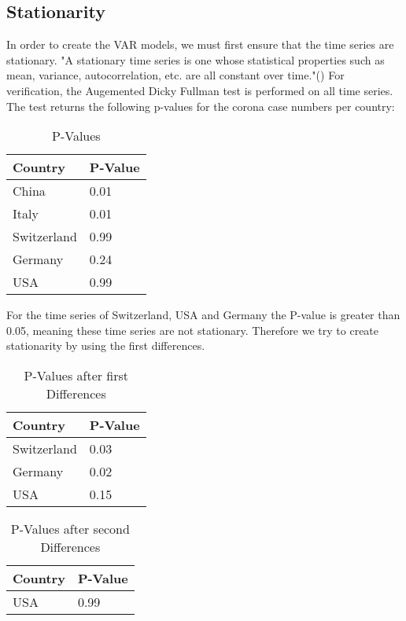 \documentclass[11pt]{article}
\begin{document}
\subsection{Stationarity}
In order to create the VAR models, we must first ensure that the time series are stationary. "A stationary time series is one whose statistical properties such as mean, variance, autocorrelation, etc. are all constant over time."(\cite{Stationa72:online}) For verification, the Augemented Dicky Fullman test is performed on all time series. The test returns the following p-values for the corona case numbers per country:
\begin{table}[h!]
\centering
\caption{P-Values }
\label{tab:p-values-corona}
\begin{tabular}{|l|l|}
\hline
\textbf{Country} & \textbf{P-Value} \\ \hline
China            & 0.01             \\ \hline
Italy            & 0.01             \\ \hline
Switzerland      & 0.99             \\ \hline
Germany          & 0.24             \\ \hline
USA              & 0.99             \\ \hline
\end{tabular}
\end{table}
For the time series of Switzerland, USA and Germany the P-value is greater than 0.05, meaning these time series are not stationary. Therefore we try to create stationarity by using the first differences.
\begin{table}[h!]
\centering
\caption{P-Values after first Differences}
\label{tab:p-values-first-diff}
\begin{tabular}{|l|l|}
\hline
\textbf{Country} & \textbf{P-Value} \\ \hline
Switzerland      & 0.03             \\ \hline
Germany          & 0.02             \\ \hline
USA              & 0.15             \\ \hline
\end{tabular}
\end{table}

\begin{table}[h!]
\centering
\caption{P-Values after second Differences}
\label{tab:p-values-second-diff}
\begin{tabular}{|l|l|}
\hline
\textbf{Country} & \textbf{P-Value} \\ \hline
USA              & 0.99             \\ \hline
\end{tabular}
\end{table}
\end{document}
